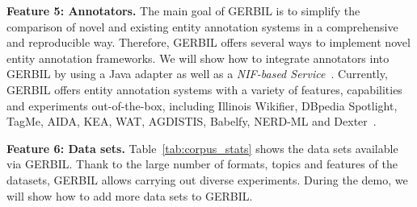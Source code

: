 \textbf{Feature 5: Annotators.}
The main goal of GERBIL is to simplify the comparison of novel and existing entity annotation systems in a comprehensive and reproducible way.
Therefore, GERBIL offers several  ways to implement novel entity annotation frameworks.
We will show how to integrate annotators into GERBIL by using a Java adapter as well as a \emph{NIF-based Service}~\cite{NIF}.%
Currently, GERBIL offers \overallGERBILannotators entity annotation systems with a variety of features, capabilities and experiments out-of-the-box, including Illinois Wikifier, DBpedia Spotlight, TagMe, AIDA, KEA, WAT, AGDISTIS, Babelfy, NERD-ML and Dexter~\cite{GERBIL}.   

\textbf{Feature 6: Data sets.}
Table~\ref{tab:corpus_stats} shows the \overalldatasets data sets available via GERBIL. 
Thank to the large number of formats, topics and features of the datasets, GERBIL allows carrying out diverse experiments. During the demo, we will show how to add more data sets to GERBIL.

